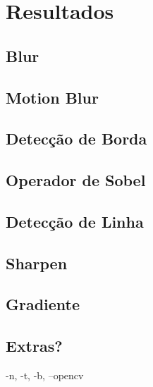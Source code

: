 \section{Resultados}

\subsection{Blur} \label{sec:blur}

    

\subsection{Motion Blur} \label{sec:motion}

    

\subsection{Detecção de Borda} \label{sec:borda}

    

\subsection{Operador de Sobel} \label{sec:sobel}

    

\subsection{Detecção de Linha} \label{sec:linha}

    

\subsection{Sharpen} \label{sec:sharpen}

    

\subsection{Gradiente} \label{sec:grad}

    

\subsection{Extras?}

    -n, -t, -b, --opencv
